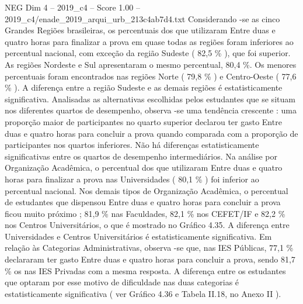 \begin{textsample}{NEG Dim 4 – 2019\_c4 – Score 1.00 – 2019\_c4/enade\_2019\_arqui\_urb\_213c4ab7d4.txt}
Considerando -se as cinco Grandes Regiões brasileiras, os percentuais dos que utilizaram Entre duas e quatro horas para finalizar a prova em quase todas as regiões foram inferiores ao percentual nacional, com exceção da região Sudeste ( 82,5 \% ), que foi superior.
As regiões Nordeste e Sul apresentaram o mesmo percentual, 80,4 \%.
Os menores percentuais foram encontrados nas regiões Norte ( 79,8 \% ) e Centro-Oeste ( 77,6 \% ).
A diferença entre a região Sudeste e as demais regiões é estatisticamente significativa.
Analisadas as alternativas escolhidas pelos estudantes que se situam nos diferentes quartos de desempenho, observa -se uma tendência crescente : uma proporção maior de participantes no quarto superior declarou ter gasto Entre duas e quatro horas para concluir a prova quando comparada com a proporção de participantes nos quartos inferiores.
Não há diferenças estatisticamente significativas entre os quartos de desempenho intermediários.
Na análise por Organização Acadêmica, o percentual dos que utilizaram Entre duas e quatro horas para finalizar a prova nas Universidades ( 80,1 \% ) foi inferior ao percentual nacional.
Nos demais tipos de Organização Acadêmica, o percentual de estudantes que dispensou Entre duas e quatro horas para concluir a prova ficou muito próximo ; 81,9 \% nas Faculdades, 82,1 \% nos CEFET/IF e 82,2 \% nos Centros Universitários, o que é mostrado no Gráfico 4.35.
A diferença entre Universidades e Centros Universitários é estatisticamente significativa.
Em relação às Categorias Administrativas, observa -se que, nas IES Públicas, 77,1 \% declararam ter gasto Entre duas e quatro horas para concluir a prova, sendo 81,7 \% os nas IES Privadas com a mesma resposta.
A diferença entre os estudantes que optaram por esse motivo de dificuldade nas duas categorias é estatisticamente significativa ( ver Gráfico 4.36 e Tabela II.18, no Anexo II ).

\end{textsample}
